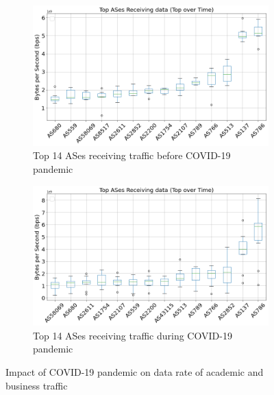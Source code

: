\documentclass[10pt, journal, letterpaper]{IEEEtran}
\newcommand\figSzeMahdi{0.8}
\begin{document}
\begin{figure}
    \begin{subfigure}{\figSzeMahdi\columnwidth}
          \centering
          \includegraphics[width=\columnwidth]{img/BCO2_top14AS_recieving_bps.png}
          \caption{Top 14 ASes receiving traffic before COVID-19 pandemic}
          \label{fig:BCO2_topAS_rec_bps}
    \end{subfigure}
    \begin{subfigure}{\figSzeMahdi\columnwidth}
          \centering
          \includegraphics[width=\columnwidth]{img/CO2_top14AS_recieving_bps.png}
          \caption{Top 14 ASes receiving traffic during COVID-19 pandemic}
          \label{fig:CO2_topAS_rec_bps}
    \end{subfigure}
    \caption{Impact of COVID-19 pandemic on data rate of academic and business traffic}
    \label{fig:topAS_rec_BCO_CO}
\end{figure}
\end{document}

